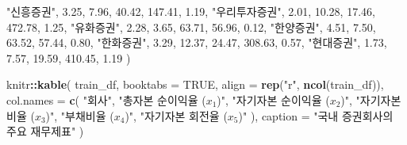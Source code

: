 \documentclass[]{book}
\newenvironment{Shaded}{\begin{snugshade}}{\end{snugshade}}
\newcommand{\DataTypeTok}[1]{\textcolor[rgb]{0.13,0.29,0.53}{#1}}
\newcommand{\FloatTok}[1]{\textcolor[rgb]{0.00,0.00,0.81}{#1}}
\newcommand{\KeywordTok}[1]{\textcolor[rgb]{0.13,0.29,0.53}{\textbf{#1}}}
\newcommand{\NormalTok}[1]{#1}
\newcommand{\OperatorTok}[1]{\textcolor[rgb]{0.81,0.36,0.00}{\textbf{#1}}}
\newcommand{\OtherTok}[1]{\textcolor[rgb]{0.56,0.35,0.01}{#1}}
\newcommand{\StringTok}[1]{\textcolor[rgb]{0.31,0.60,0.02}{#1}}
\begin{document}
\begin{Shaded}
\begin{Highlighting}[]
  \StringTok{"신흥증권"}\NormalTok{, }\FloatTok{3.25}\NormalTok{, }\FloatTok{7.96}\NormalTok{, }\FloatTok{40.42}\NormalTok{, }\FloatTok{147.41}\NormalTok{, }\FloatTok{1.19}\NormalTok{,}
  \StringTok{"우리투자증권"}\NormalTok{, }\FloatTok{2.01}\NormalTok{, }\FloatTok{10.28}\NormalTok{, }\FloatTok{17.46}\NormalTok{, }\FloatTok{472.78}\NormalTok{, }\FloatTok{1.25}\NormalTok{,}
  \StringTok{"유화증권"}\NormalTok{, }\FloatTok{2.28}\NormalTok{, }\FloatTok{3.65}\NormalTok{, }\FloatTok{63.71}\NormalTok{, }\FloatTok{56.96}\NormalTok{, }\FloatTok{0.12}\NormalTok{,}
  \StringTok{"한양증권"}\NormalTok{, }\FloatTok{4.51}\NormalTok{, }\FloatTok{7.50}\NormalTok{, }\FloatTok{63.52}\NormalTok{, }\FloatTok{57.44}\NormalTok{, }\FloatTok{0.80}\NormalTok{,}
  \StringTok{"한화증권"}\NormalTok{, }\FloatTok{3.29}\NormalTok{, }\FloatTok{12.37}\NormalTok{, }\FloatTok{24.47}\NormalTok{, }\FloatTok{308.63}\NormalTok{, }\FloatTok{0.57}\NormalTok{,}
  \StringTok{"현대증권"}\NormalTok{, }\FloatTok{1.73}\NormalTok{, }\FloatTok{7.57}\NormalTok{, }\FloatTok{19.59}\NormalTok{, }\FloatTok{410.45}\NormalTok{, }\FloatTok{1.19}
\NormalTok{)}

\NormalTok{knitr}\OperatorTok{::}\KeywordTok{kable}\NormalTok{(}
\NormalTok{  train_df, }\DataTypeTok{booktabs =} \OtherTok{TRUE}\NormalTok{,}
  \DataTypeTok{align =} \KeywordTok{rep}\NormalTok{(}\StringTok{"r"}\NormalTok{, }\KeywordTok{ncol}\NormalTok{(train_df)),}
  \DataTypeTok{col.names =} \KeywordTok{c}\NormalTok{(}
    \StringTok{"회사"}\NormalTok{,}
    \StringTok{"총자본 순이익율 ($x_1$)"}\NormalTok{,}
    \StringTok{"자기자본 순이익율 ($x_2$)"}\NormalTok{,}
    \StringTok{"자기자본비율 ($x_3$)"}\NormalTok{,}
    \StringTok{"부채비율 ($x_4$)"}\NormalTok{,}
    \StringTok{"자기자본 회전율 ($x_5$)"}
\NormalTok{  ),}
  \DataTypeTok{caption =} \StringTok{"국내 증권회사의 주요 재무제표"}
\NormalTok{)}
\end{Highlighting}
\end{Shaded}
\end{document}
